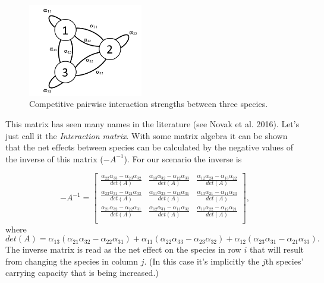 \documentclass[10pt,letterpaper]{article}
\begin{document}
\begin{figure}[ht!]
\centering
\includegraphics[width=50mm]{figs/3spComp.png}
	\caption{Competitive pairwise interaction strengths between three species.}
	\label{fig:3spComp}
\end{figure}


\noindent
This matrix has seen many names in the literature (see Novak et al. 2016). Let's just call it the \emph{Interaction matrix}.  With some matrix algebra it can be shown that the net effects between species can be calculated by the negative values of the inverse of this matrix ($-A^{-1}$). For our scenario the inverse is

\begin{equation}
-A^{-1}=\left[\begin{array}{ccc}
 \frac{\alpha _{22} \alpha _{33}-\alpha _{23} \alpha _{32}}{det(A)} & \frac{\alpha _{13} \alpha _{32}-\alpha _{12} \alpha _{33}}{det(A)} & \frac{\alpha _{12} \alpha _{23}-\alpha _{13} \alpha _{22}}{det(A)} \\
 \frac{\alpha _{23} \alpha _{31}-\alpha _{21} \alpha _{33}}{det(A)}  & \frac{\alpha _{11} \alpha _{33}-\alpha _{13} \alpha _{31}}{det(A)}  & \frac{\alpha _{13} \alpha _{21}-\alpha _{11} \alpha _{23}}{det(A)}  \\
 \frac{\alpha _{21} \alpha _{32}-\alpha _{22} \alpha _{31}}{det(A)}  & \frac{ \alpha _{12} \alpha _{31}-\alpha _{11} \alpha _{32}}{det(A)}  & \frac{\alpha _{11} \alpha _{22}-\alpha _{12} \alpha _{21}}{det(A)}  \\
\end{array}\right],
\end{equation}
where
\begin{equation*}
det(A)=\alpha _{13} \left(\alpha _{21} \alpha _{32}-\alpha _{22} \alpha _{31}\right)+\alpha _{11} \left(\alpha _{22} \alpha _{33}-\alpha _{23} \alpha _{32}\right)+\alpha _{12} \left(\alpha _{23} \alpha _{31}-\alpha _{21} \alpha _{33}\right).
\end{equation*}
The inverse matrix is read as the net effect on the species in row $i$ that will result from changing the species in column $j$.  (In this case it's implicitly the $j$th species' carrying capacity that is being increased.)  
\end{document}
